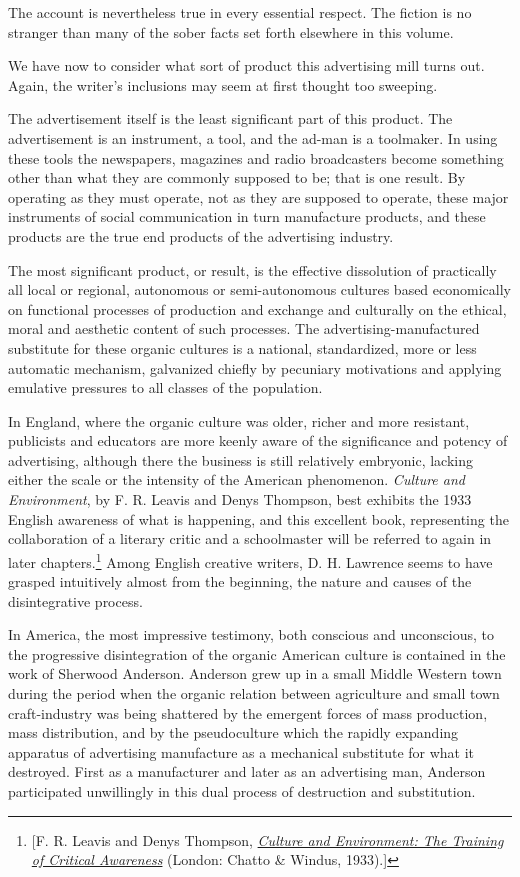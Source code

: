 \documentclass[nohyper,openany,nobib]{tufte-book}
\begin{document}
The account is nevertheless true in every essential respect. The fiction
is no stranger than many of the sober facts set forth elsewhere in this
volume.

We have now to consider what sort of product this advertising mill turns
out. Again, the writer's inclusions may seem at first thought too
sweeping.

The advertisement itself is the least significant part of this product.
The advertisement is an instrument, a tool, and the ad-man is a
toolmaker. In using these tools the newspapers, magazines and radio
broadcasters become something other than what they are commonly supposed
to be; that is one result. By operating as they must operate, not as
they are supposed to operate, these major instruments of social
communication in turn manufacture products, and these products are the
true end products of the advertising industry.

The most significant product, or result, is the effective dissolution of
practically all local or regional, autonomous or semi-autonomous
cultures based economically on functional processes of production and
exchange and culturally on the ethical, moral and aesthetic content of
such processes. The advertising-manufactured substitute for these
organic cultures is a national, standardized, more or less automatic
mechanism, galvanized chiefly by pecuniary motivations and applying
emulative pressures to all classes of the population.

In England, where the organic culture was older, richer and more
resistant, publicists and educators are more keenly aware of the
significance and potency of advertising, although there the business is
still relatively embryonic, lacking either the scale or the intensity of
the American phenomenon. \emph{Culture and Environment}, by F. R. Leavis
and Denys Thompson, best exhibits the 1933 English awareness of what is
happening, and this excellent book, representing the collaboration of a
literary critic and a schoolmaster will be referred to again in later
chapters.\footnote{{[}F. R. Leavis and Denys Thompson,
  \emph{\href{http://www.worldcat.org/oclc/188346}{Culture and
  Environment: The Training of Critical Awareness}} (London: Chatto \&
  Windus, 1933).{]}} Among English creative writers, D. H. Lawrence seems to
have grasped intuitively almost from the beginning, the nature and
causes of the disintegrative process.

In America, the most impressive testimony, both conscious and
unconscious, to the progressive disintegration of the organic American
culture is contained in the work of Sherwood Anderson. Anderson grew up
in a small Middle Western town during the period when the organic
relation between agriculture and small town craft-industry was being
shattered by the emergent forces of mass production, mass distribution,
and by the pseudoculture which the rapidly expanding apparatus of
advertising manufacture as a mechanical substitute for what it
destroyed. First as a manufacturer and later as an advertising man,
Anderson participated unwillingly in this dual process of destruction
and substitution.
\end{document}
